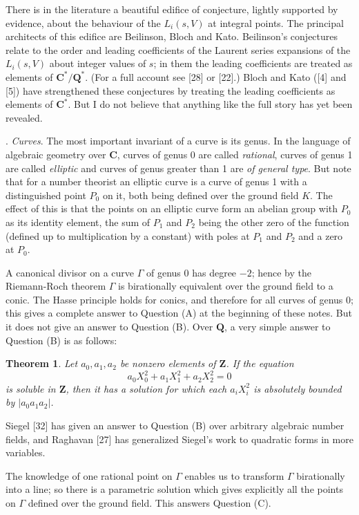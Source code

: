 \documentclass[12pt]{article}
\def\bC{{\mathbf C}}
\def\bQ{{\mathbf Q}}
\def\bZ{{\mathbf Z}}
\def\gG{{\Gamma}}
\def\bth{\begin{theorem} \label}
\def\eth{\end{theorem}}
\newtheorem{theorem}{Theorem}
\begin{document}
There is in the literature a beautiful edifice of conjecture, lightly
supported by evidence, about the behaviour of the $L_i(s,V)$
at integral points.  The principal architects of this edifice are Beilinson,
Bloch and Kato. Beilinson's conjectures relate to the order and leading
coefficients of the Laurent series expansions of the $L_i(s,V)$ about integer
values of $s$; in them
the leading coefficients are treated as elements of $\bC^*/
\bQ^*$. (For a full account see [28] or [22].) Bloch and Kato ([4] and
[5]) have strengthened these conjectures by treating the leading coefficients
as elements of $\bC^*$. But I do not believe that anything like the full story
has yet been revealed.

\bigskip

. \emph{Curves}. \newline
The most important invariant of a curve is its genus. In the language of
algebraic geometry over $\bC$, curves of genus 0 are called \emph{rational},
curves of genus 1 are called \emph{elliptic} and curves of genus greater than
1 are \emph{of general type}. But note that for a number theorist an elliptic
curve is a curve of genus 1 with a distinguished point $P_0$ on it, both being
defined over the ground field $K$. The effect of this is that the points on an
elliptic curve form an abelian group with $P_0$ as its identity
element, the sum of $P_1$ and $P_2$ being the
other zero of the function (defined up to multiplication by a constant) with
poles at $P_1$ and $P_2$ and a zero at $P_0$.

A canonical divisor on a curve $\gG$ of genus 0 has degree $-2$; hence by the
Riemann-Roch theorem $\gG$ is birationally equivalent over the ground
field to a conic. The Hasse
principle holds for conics, and therefore for all curves of genus 0; this gives
a complete answer to Question (A) at the beginning of these notes. But it does
not give an answer to Question (B). Over $\bQ$, a very simple answer to
Question (B) is as follows:
\bth{T1} Let $a_0,a_1,a_2$ be nonzero elements of $\bZ$. If the equation
\[ a_0X_0^2+a_1X_1^2+a_2X_2^2=0 \]
is soluble in $\bZ$, then it has a solution for which each $a_iX_i^2$ is
absolutely bounded by $|a_0a_1a_2|$.
\eth
Siegel [32] has given an answer to Question (B) over arbitrary algebraic
number fields, and Raghavan [27] has generalized Siegel's work to quadratic
forms in more variables.

The knowledge of one rational point on $\gG$ enables us to transform $\gG$ 
birationally into a line; so there is a parametric solution which gives
explicitly all the points on $\gG$ defined over the ground field. This
answers Question (C).
\end{document}
